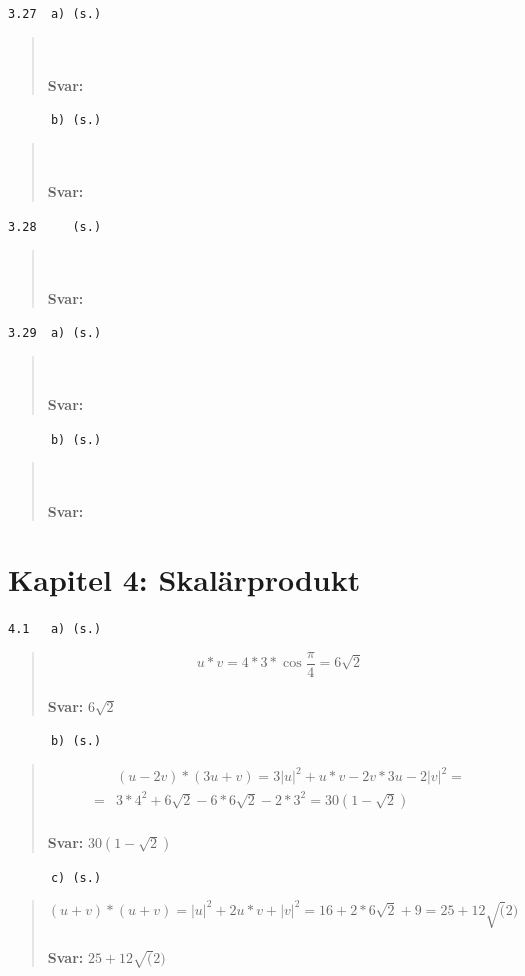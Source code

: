 \documentclass[a4paper]{article}
\newcommand{\tskcol}[1]{\textcolor{tskcol}{#1}}
\begin{document}
\texttt{\tskcol{3.27~~a) (s.)}}
\begin{quotation}
	\noindent
	\\ \\
	\textbf{Svar:}
\end{quotation}

\texttt{\tskcol{~~~~~~b) (s.)}}
\begin{quotation}
	\noindent
	\\ \\
	\textbf{Svar:}
\end{quotation}

\texttt{\tskcol{3.28~~~~ (s.)}}
\begin{quotation}
	\noindent
	\\ \\
	\textbf{Svar:}
\end{quotation}

\texttt{\tskcol{3.29~~a) (s.)}}
\begin{quotation}
	\noindent
	\\ \\
	\textbf{Svar:}
\end{quotation}

\texttt{\tskcol{~~~~~~b) (s.)}}
\begin{quotation}
	\noindent
	\\ \\
	\textbf{Svar:}
\end{quotation}

\pagebreak
\section*{Kapitel 4: Skalärprodukt}

\texttt{\tskcol{4.1~~~a) (s.)}}
\begin{quotation}
	\noindent
	\[u*v=4*3*\cos\frac{\pi}{4}=6\sqrt{2}\]
	\\
	\textbf{Svar:} $6\sqrt{2}$
\end{quotation}

\texttt{\tskcol{~~~~~~b) (s.)}}
\begin{quotation}
	\noindent
	\begin{align*}
	&(u-2v)*(3u+v)=
	3|u|^2+u*v-2v*3u-2|v|^2= \\ =
	&3*4^2+6\sqrt{2}-6*6\sqrt{2}-2*3^2=
	30(1-\sqrt{2})
	\end{align*}
	\\
	\textbf{Svar:} $30(1-\sqrt{2})$
\end{quotation}

\texttt{\tskcol{~~~~~~c) (s.)}}
\begin{quotation}
	\noindent
	\[(u+v)*(u+v)=
	|u|^2+2u*v+|v|^2=
	16+2*6\sqrt{2}+9=
	25+12\sqrt(2)\]
	\\
	\textbf{Svar:} $25+12\sqrt(2)$
\end{quotation}
\end{document}
